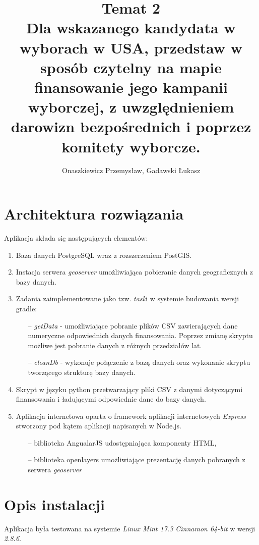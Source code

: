 \documentclass[10pt,a4paper]{article}
\author{Onaszkiewicz Przemysław, Gadawski Łukasz}
\title{Temat 2\\ Dla wskazanego kandydata w wyborach w USA, przedstaw w sposób czytelny na mapie finansowanie jego kampanii wyborczej, z uwzględnieniem darowizn bezpośrednich i poprzez komitety wyborcze. 
}
\begin{document}
\maketitle

\section{Architektura rozwiązania}
Aplikacja składa się następujących elementów:
\begin{enumerate}
\item Baza danych PostgreSQL wraz z rozszerzeniem PostGIS.
\item Instacja serwera \textit{geoserver} umożliwiająca pobieranie danych geograficznych z bazy danych.
\item Zadania zaimplementowane jako tzw. \textit{task}i w systemie budowania wersji gradle:
\begin{itemize}
\item[--] \textit{getData} - umożliwiające pobranie plików CSV zawierających dane numeryczne odpowiednich danych finansowania. Poprzez zmianę skryptu możliwe jest pobranie danych z różnych przedziałów lat.
\item[--] \textit{cleanDb} - wykonuje połączenie z bazą danych oraz wykonanie skryptu tworzącego strukturę bazy danych.
\end{itemize} 
\item Skrypt w języku python przetwarzający pliki CSV z danymi dotyczącymi finansowania i ładującymi odpowiednie dane do bazy danych.
\item Aplikacja internetowa oparta o framework aplikacji internetowych \textit{Express} stworzony pod kątem aplikacji napisanych w Node.js.
\begin{itemize}
\item[--] biblioteka AngualarJS udostępniająca komponenty HTML,
\item[--] biblioteka openlayers umożliwiające prezentację danych pobranych z serwera \textit{geoserver}
\end{itemize}
\end{enumerate}
\section{Opis instalacji}
Aplikacja była testowana na systemie \textit{Linux Mint 17.3 Cinnamon 64-bit} w wersji \textit{2.8.6}. 
\end{document}
